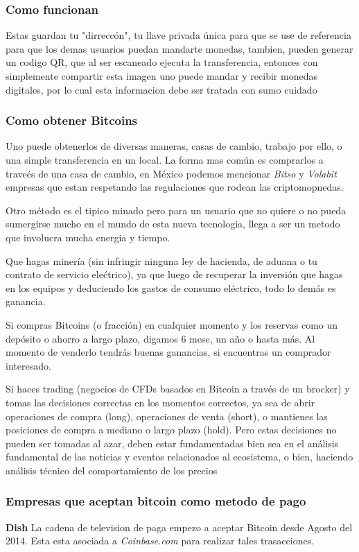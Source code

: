 \documentclass[12pt,letterpaper]{article}
\begin{document}
                \subsubsection*{Como funcionan}
				Estas guardan tu "dirrecc\'on", tu llave privada \'unica para que se use de referencia para que los demas usuarios puedan mandarte monedas, tambien, pueden generar un codigo QR, que al ser escaneado ejecuta la transferencia, entonces con simplemente compartir esta imagen uno puede mandar y recibir monedas digitales, por lo cual esta informacion debe ser tratada con sumo cuidado                                
            \subsubsection*{Como obtener Bitcoins}
	Uno puede obtenerlos de diversas maneras, casas de cambio, trabajo por ello, o una simple transferencia en un local. La forma mas com\'un es comprarlos a trave\'es de una casa de cambio, en M\'exico podemos mencionar \textit{Bitso} y \textit{Volabit} empresas que estan respetando las regulaciones que rodean las criptomopnedas.
	
	Otro m\'etodo es el tipico minado pero para un usuario que no quiere o no pueda sumergirse mucho en el mundo de esta nueva tecnologia, llega a ser un metodo que involucra mucha energia y tiempo.
	
        Que hagas minería (sin infringir ninguna ley de hacienda, de aduana o tu contrato de servicio elećtrico), ya que luego de recuperar la inversión que hagas en los equipos y deduciendo los gastos de consumo eléctrico, todo lo demás es ganancia.

        Si compras Bitcoins (o fracción) en cualquier momento y los reservas como un depósito o ahorro a largo plazo, digamos 6 mese, un año o hasta más. Al momento de venderlo tendrás buenas ganancias, si encuentras un comprador interesado.

        Si haces trading (negocios de CFDs basados en Bitcoin a través de un brocker) y tomas las decisiones correctas en los momentos correctos, ya sea de abrir operaciones de compra (long), operaciones de venta (short), o mantienes las posiciones de compra a mediano o largo plazo (hold).
        Pero estas decisiones no pueden ser tomadas al azar, deben estar fundamentadas bien sea en el análisis fundamental de las noticias y eventos relacionados al ecosistema, o bien, haciendo análisis técnico del comportamiento de los precios
            \subsubsection*{Empresas que aceptan bitcoin como metodo de pago}
\textbf{Dish}
La cadena de television de paga empezo a aceptar Bitcoin desde Agosto del 2014. Esta esta asociada a \textit{Coinbase.com} para realizar tales trasacciones.
\end{document}

